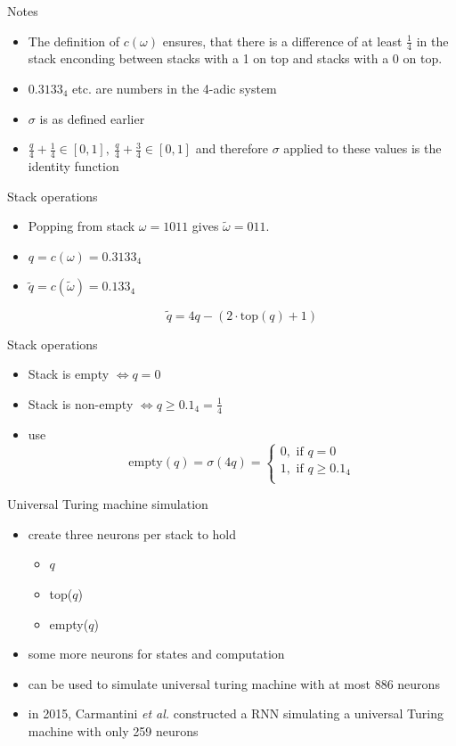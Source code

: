 \begin{frame}[beamer:0]{Notes}
\begin{itemize}
\item The definition of $c(\omega)$ ensures, that there is a difference of at least $\frac{1}{4}$ in the stack enconding between stacks with a 1 on top and stacks with a 0 on top. 
\item $0.3133_4$ etc. are numbers in the 4-adic system
\item $\sigma$ is as defined earlier
\item $ \frac{q}{4} + \frac{1}{4} \in [0,1], \  \frac{q}{4} + \frac{3}{4} \in [0,1]$ and therefore $\sigma$ applied to these values is the identity function
\end{itemize}
\end{frame}


\begin{frame}{Stack operations}
\begin{itemize}
\item Popping from stack $\omega = 1011$ gives $\tilde{\omega} = 011$.
\item $q = c(\omega) = 0.3133_4$
\item $\tilde{q} = c(\tilde{\omega}) = 0.133_4$ 

\[\tilde{q} = 4q - (2\cdot\text{top}(q) + 1) \]
\end{itemize}
\end{frame}



\begin{frame}{Stack operations}
\begin{itemize}
\item Stack is empty $\Leftrightarrow q = 0$
\item Stack is non-empty $\Leftrightarrow q \geq 0.1_4 = \frac{1}{4}$
\item use \[\text{empty}(q)=\sigma(4q) = \begin{cases} 0, \text{ if } q = 0\\
1, \text{ if } q \geq 0.1_4\\ 
\end{cases}\]
\end{itemize}
\end{frame}


\begin{frame}{Universal Turing machine simulation}
\begin{itemize}
\item create three neurons per stack to hold 
\begin{itemize}
\item $q$
\item top($q$)
\item empty($q$)
\end{itemize}
\item some more neurons for states and computation
\item can be used to simulate universal turing machine with at most 886 neurons
\item in 2015, Carmantini \emph{et al.} \cite{CaEtAl15} constructed a RNN simulating a universal Turing machine with only 259 neurons
\end{itemize}
\end{frame}

